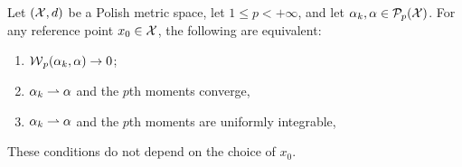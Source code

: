 \begin{prop}\label{prop-wass-topology-polish}
	Let $(\mathcal{X},d)$ be a Polish metric space, let $1\leq p<+\infty$, and let $\alpha_k,\alpha\in\mathcal{P}_p(\mathcal{X})$. For any reference point $x_0\in\mathcal{X}$, the following are equivalent:
	\begin{enumerate}
		\item $\operatorname{\mathcal{W}}_p(\alpha_k,\alpha)\to0$;
		\item $\alpha_k\rightharpoonup\alpha$ and the $p$th moments converge,
		\item $\alpha_k\rightharpoonup\alpha$ and the $p$th moments are uniformly integrable,
	\end{enumerate}
	These conditions do not depend on the choice of $x_0$.
\end{prop}
